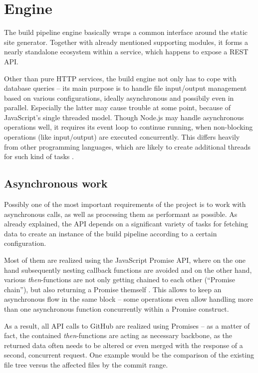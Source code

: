 \section{Engine}
\label{sec:engine}

The build pipeline engine basically wraps a common interface around the static site generator. Together with already mentioned supporting modules, it forms a nearly standalone ecosystem within a service, which happens to expose a REST API.

Other than pure HTTP services, the build engine not only has to cope with database queries -- its main purpose is to handle file input/output management based on various configurations, ideally asynchronous and possibily even in parallel. Especially the latter may cause trouble at some point, because of JavaScript's single threaded model. Though Node.js may handle asynchronous operations well, it requires its event loop to continue running, when non-blocking operations (like input/output) are executed concurrently. This differs heavily from other programming languages, which are likely to create additional threads for such kind of tasks \cite{NodejsBlockingNonblocking}.

\subsection{Asynchronous work}
Possibly one of the most important requirements of the project is to work with asynchronous calls, as well as processing them as performant as possible. As already explained, the API depends on a significant variety of tasks for fetching data to create an instance of the build pipeline according to a certain configuration.

Most of them are realized using the JavaScript Promise API, where on the one hand subsequently nesting callback functions are avoided and on the other hand, various \emph{then}-functions are not only getting chained to each other (``Promise chain''), but also returning a Promise themself \cite{MDNPromise}. This allows to keep an asynchronous flow in the same block -- some operations even allow handling more than one asynchronous function concurrently within a Promise construct.

As a result, all API calls to GitHub are realized using Promises -- as a matter of fact, the contained \emph{then}-functions are acting as necessary backbone, as the returned data often needs to be altered or even merged with the response of a second, concurrent request. One example would be the comparison of the existing file tree versus the affected files by the commit range.

